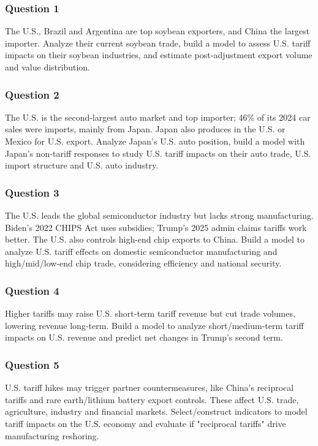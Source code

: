 \documentclass{apmcmthesis}
\begin{document}
\subsubsection{Question 1}
The U.S., Brazil and Argentina are top soybean exporters, and China the largest importer. Analyze their current soybean trade, build a model to assess U.S. tariff impacts on their soybean industries, and estimate post-adjustment export volume and value distribution.

\subsubsection{Question 2}
The U.S. is the second-largest auto market and top importer; 46\% of its 2024 car sales were imports, mainly from Japan. Japan also produces in the U.S. or Mexico for U.S. export. Analyze Japan’s U.S. auto position, build a model with Japan’s non-tariff responses to study U.S. tariff impacts on their auto trade, U.S. import structure and U.S. auto industry.

\subsubsection{Question 3}
The U.S. leads the global semiconductor industry but lacks strong manufacturing. Biden’s 2022 CHIPS Act uses subsidies; Trump’s 2025 admin claims tariffs work better. The U.S. also controls high-end chip exports to China. Build a model to analyze U.S. tariff effects on domestic semiconductor manufacturing and high/mid/low-end chip trade, considering efficiency and national security.

\subsubsection{Question 4}
Higher tariffs may raise U.S. short-term tariff revenue but cut trade volumes, lowering revenue long-term. Build a model to analyze short/medium-term tariff impacts on U.S. revenue and predict net changes in Trump’s second term.

\subsubsection{Question 5}
U.S. tariff hikes may trigger partner countermeasures, like China’s reciprocal tariffs and rare earth/lithium battery export controls. These affect U.S. trade, agriculture, industry and financial markets. Select/construct indicators to model tariff impacts on the U.S. economy and evaluate if "reciprocal tariffs" drive manufacturing reshoring.
\end{document}
